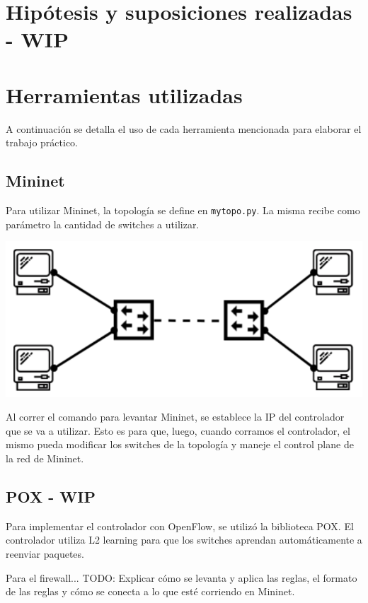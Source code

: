 \documentclass{article}
\begin{document}
\section{Hipótesis y suposiciones realizadas - WIP}\label{hipotesis-y-suposiciones-realizadas-wip}

\newpage
\section{Herramientas utilizadas}\label{implementacion-wip}
A continuación se detalla el uso de cada herramienta mencionada para elaborar el trabajo práctico.

\subsection{Mininet}\label{mininet}

Para utilizar Mininet, la topología se define en \texttt{mytopo.py}. La misma recibe como parámetro la cantidad de switches a utilizar.

\begin{center}
\includegraphics[scale=0.35]{mininet_topo.png}
\end{center}

Al correr el comando para levantar Mininet, se establece la IP del controlador que se va a utilizar. Esto es para que, luego, cuando corramos el controlador, el mismo pueda modificar los switches de la topología y maneje el control plane de la red de Mininet.

\subsection{POX - WIP}\label{pox}
Para implementar el controlador con OpenFlow, se utilizó la biblioteca POX. El controlador utiliza L2 learning para que los switches aprendan automáticamente a reenviar paquetes.

Para el firewall...
TODO: Explicar cómo se levanta y aplica las reglas, el formato de las reglas y cómo se conecta a lo que esté corriendo en Mininet.
\end{document}

